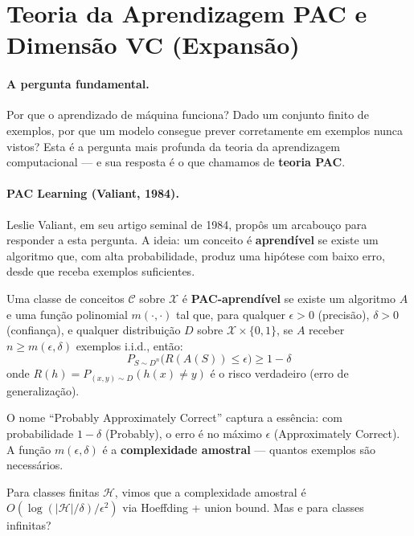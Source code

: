 \documentclass{tufte-handout}
\begin{document}
\section{Teoria da Aprendizagem PAC e Dimensão VC (Expansão)}

\paragraph{A pergunta fundamental.}

Por que o aprendizado de máquina funciona? Dado um conjunto finito de exemplos, por que um modelo consegue prever corretamente em exemplos nunca vistos? Esta é a pergunta mais profunda da teoria da aprendizagem computacional --- e sua resposta é o que chamamos de \textbf{teoria PAC}.

\paragraph{PAC Learning (Valiant, 1984).}

Leslie Valiant, em seu artigo seminal de 1984, propôs um arcabouço para responder a esta pergunta. A ideia: um conceito é \textbf{aprendível} se existe um algoritmo que, com alta probabilidade, produz uma hipótese com baixo erro, desde que receba exemplos suficientes.

\begin{defn}
    Uma classe de conceitos $\mathcal{C}$ sobre $\mathcal{X}$ é \textbf{PAC-aprendível} se existe um algoritmo $A$ e uma função polinomial $m(\cdot, \cdot)$ tal que, para qualquer $\epsilon > 0$ (precisão), $\delta > 0$ (confiança), e qualquer distribuição $D$ sobre $\mathcal{X} \times \{0,1\}$, se $A$ receber $n \ge m(\epsilon, \delta)$ exemplos i.i.d., então:
    \[
    P_{S \sim D^n}\big(R(A(S)) \le \epsilon\big) \ge 1 - \delta
    \]
    onde $R(h) = P_{(x,y) \sim D}(h(x) \neq y)$ é o risco verdadeiro (erro de generalização).
\end{defn}

O nome ``Probably Approximately Correct'' captura a essência: com probabilidade $1-\delta$ (Probably), o erro é no máximo $\epsilon$ (Approximately Correct). A função $m(\epsilon, \delta)$ é a \textbf{complexidade amostral} --- quantos exemplos são necessários.

Para classes finitas $\mathcal{H}$, vimos que a complexidade amostral é $O(\log(|\mathcal{H}|/\delta)/\epsilon^2)$ via Hoeffding + union bound. Mas e para classes infinitas?
\end{document}
